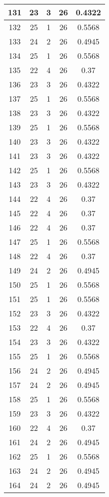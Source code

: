 \documentclass[letterpaper, 12pt]{article}
\begin{document}
\begin{longtable}{|c|c|c|c|c|}
\hline
131 & 23 & 3 & 26 & 0.4322 \\
\hline
132 & 25 & 1 & 26 & 0.5568 \\
\hline
133 & 24 & 2 & 26 & 0.4945 \\
\hline
134 & 25 & 1 & 26 & 0.5568 \\
\hline
135 & 22 & 4 & 26 & 0.37 \\
\hline
136 & 23 & 3 & 26 & 0.4322 \\
\hline
137 & 25 & 1 & 26 & 0.5568 \\
\hline
138 & 23 & 3 & 26 & 0.4322 \\
\hline
139 & 25 & 1 & 26 & 0.5568 \\
\hline
140 & 23 & 3 & 26 & 0.4322 \\
\hline
141 & 23 & 3 & 26 & 0.4322 \\
\hline
142 & 25 & 1 & 26 & 0.5568 \\
\hline
143 & 23 & 3 & 26 & 0.4322 \\
\hline
144 & 22 & 4 & 26 & 0.37 \\
\hline
145 & 22 & 4 & 26 & 0.37 \\
\hline
146 & 22 & 4 & 26 & 0.37 \\
\hline
147 & 25 & 1 & 26 & 0.5568 \\
\hline
148 & 22 & 4 & 26 & 0.37 \\
\hline
149 & 24 & 2 & 26 & 0.4945 \\
\hline
150 & 25 & 1 & 26 & 0.5568 \\
\hline
151 & 25 & 1 & 26 & 0.5568 \\
\hline
152 & 23 & 3 & 26 & 0.4322 \\
\hline
153 & 22 & 4 & 26 & 0.37 \\
\hline
154 & 23 & 3 & 26 & 0.4322 \\
\hline
155 & 25 & 1 & 26 & 0.5568 \\
\hline
156 & 24 & 2 & 26 & 0.4945 \\
\hline
157 & 24 & 2 & 26 & 0.4945 \\
\hline
158 & 25 & 1 & 26 & 0.5568 \\
\hline
159 & 23 & 3 & 26 & 0.4322 \\
\hline
160 & 22 & 4 & 26 & 0.37 \\
\hline
161 & 24 & 2 & 26 & 0.4945 \\
\hline
162 & 25 & 1 & 26 & 0.5568 \\
\hline
163 & 24 & 2 & 26 & 0.4945 \\
\hline
164 & 24 & 2 & 26 & 0.4945 \\

\end{longtable}
\end{document}
